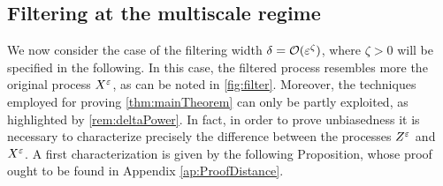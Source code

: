 \documentclass[review,onefignum,onetabnum]{siamonline190516}
\begin{document}

\subsection{Filtering at the multiscale regime}\label{sec:Fast}


We now consider the case of the filtering width $\delta = \mathcal O(\varepsilon^\zeta)$, where $\zeta > 0$ will be specified in the following. In this case, the filtered process resembles more the original process $X^\varepsilon$, as can be noted in \cref{fig:filter}. Moreover, the techniques employed for proving \cref{thm:mainTheorem} can only be partly exploited, as highlighted by \cref{rem:deltaPower}. In fact, in order to prove unbiasedness it is necessary to characterize precisely the difference between the processes $Z^\varepsilon$ and $X^\varepsilon$. A first characterization is given by the following Proposition, whose proof ought to be found in Appendix \ref{ap:ProofDistance}.
\end{document}
